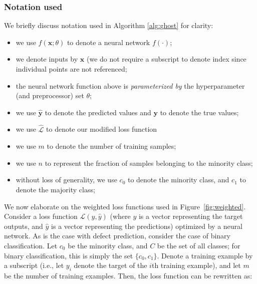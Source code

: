 \documentclass[10pt,compsoc,twocolumn]{IEEEtran}
\newcommand{\respto}[1]{
\fcolorbox{black}{black!15}{%
\label{resp:#1}%
\bf\scriptsize R{#1}}}
\newcommand{\BLACK}{\color{black}}
\begin{document}
\subsubsection{Notation used}
\label{sec:notation}
We briefly discuss notation used in Algorithm \ref{alg:ghost} for clarity:  \respto{2a6.1}
\begin{itemize}
    \item we use $f(\textbf{x}; \theta)$ to denote a neural network $f(\cdot)$;
    \item we denote inputs by $\textbf{x}$ (we do not require a subscript to denote index since individual points are not referenced;
    \item the neural network function above is \textit{parameterized by} the hyperparameter (and preprocessor) set $\theta$;
    \item we use $\hat{\textbf{y}}$ to denote the predicted values and $\textbf{y}$ to denote the true values;
    \item we use $\hat{\mathcal{L}}$ to denote our modified loss function
    \item we use $m$ to denote the number of training samples;
    \item we use $n$ to represent the fraction of samples belonging to the minority class;
    \item without loss of generality, we use $c_0$ to denote the minority class, and $c_1$ to denote the majority class;
\end{itemize}
\BLACK
 

We now elaborate on the weighted loss functions used in
Figure~\ref{fig:weighted}.  Consider a loss function $\mathcal{L}(y, \hat{y})$ (where $y$ is a vector representing the target outputs, and $\hat{y}$ is a vector representing the predictions) optimized by a neural network. As is the case with defect prediction, consider the case of binary classification. Let $c_0$ be the minority class, and $C$ be the set of all classes; for binary classification, this is simply the set $\{c_0, c_1\}$. Denote a training example by a subscript (i.e., let $y_i$ denote the target of the $i$th training example), and let $m$ be the number of training examples. Then, the loss function can be rewritten as:
\end{document}

